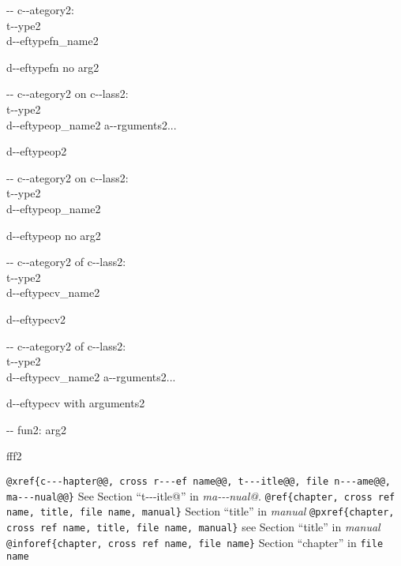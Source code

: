\documentclass{book}
\begin{document}
\hbox{}{-}{-} c{-}{-}ategory2:\leavevmode{}\\t{-}{-}ype2\leavevmode{}\\d{-}{-}eftypefn\_name2


%
d{-}{-}eftypefn no arg2

\hbox{}{-}{-} c{-}{-}ategory2 on c{-}{-}lass2:\leavevmode{}\\t{-}{-}ype2\leavevmode{}\\d{-}{-}eftypeop\_name2 a{-}{-}rguments2...


%
d{-}{-}eftypeop2

\hbox{}{-}{-} c{-}{-}ategory2 on c{-}{-}lass2:\leavevmode{}\\t{-}{-}ype2\leavevmode{}\\d{-}{-}eftypeop\_name2


%
d{-}{-}eftypeop no arg2

\hbox{}{-}{-} c{-}{-}ategory2 of c{-}{-}lass2:\leavevmode{}\\t{-}{-}ype2\leavevmode{}\\d{-}{-}eftypecv\_name2


%
d{-}{-}eftypecv2

\hbox{}{-}{-} c{-}{-}ategory2 of c{-}{-}lass2:\leavevmode{}\\t{-}{-}ype2\leavevmode{}\\d{-}{-}eftypecv\_name2 a{-}{-}rguments2...


%
d{-}{-}eftypecv with arguments2

\hbox{}{-}{-} fun2: arg2


%
fff2


\texttt{@xref\{c{-}{-}{-}hapter@@, cross r{-}{-}{-}ef name@@, t{-}{-}{-}itle@@, file n{-}{-}{-}ame@@, ma{-}{-}{-}nual@@\}} See Section ``t{-}{-}{-}itle@'' in \textit{ma{-}{-}{-}nual@}.
\texttt{@ref\{chapter, cross ref name, title, file name, manual\}} Section ``title'' in \textit{manual}
\texttt{@pxref\{chapter, cross ref name, title, file name, manual\}} see Section ``title'' in \textit{manual}
\texttt{@inforef\{chapter, cross ref name, file name\}} Section ``chapter'' in \texttt{file name}
\end{document}
